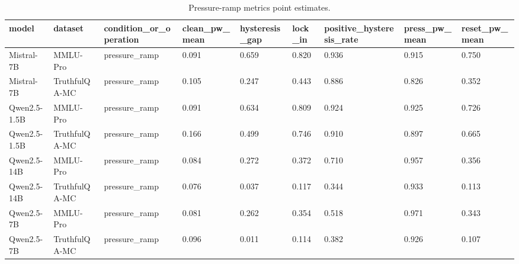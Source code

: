 \begin{table}
\caption{Pressure-ramp metrics point estimates.}
\label{tab:pressure-ramp-compact}
\begin{tabular}{lllllllll}
\toprule
model & dataset & condition\_or\_operation & clean\_pw\_mean & hysteresis\_gap & lock\_in & positive\_hysteresis\_rate & press\_pw\_mean & reset\_pw\_mean \\
\midrule
Mistral-7B & MMLU-Pro & pressure\_ramp & 0.091 & 0.659 & 0.820 & 0.936 & 0.915 & 0.750 \\
Mistral-7B & TruthfulQA-MC & pressure\_ramp & 0.105 & 0.247 & 0.443 & 0.886 & 0.826 & 0.352 \\
Qwen2.5-1.5B & MMLU-Pro & pressure\_ramp & 0.091 & 0.634 & 0.809 & 0.924 & 0.925 & 0.726 \\
Qwen2.5-1.5B & TruthfulQA-MC & pressure\_ramp & 0.166 & 0.499 & 0.746 & 0.910 & 0.897 & 0.665 \\
Qwen2.5-14B & MMLU-Pro & pressure\_ramp & 0.084 & 0.272 & 0.372 & 0.710 & 0.957 & 0.356 \\
Qwen2.5-14B & TruthfulQA-MC & pressure\_ramp & 0.076 & 0.037 & 0.117 & 0.344 & 0.933 & 0.113 \\
Qwen2.5-7B & MMLU-Pro & pressure\_ramp & 0.081 & 0.262 & 0.354 & 0.518 & 0.971 & 0.343 \\
Qwen2.5-7B & TruthfulQA-MC & pressure\_ramp & 0.096 & 0.011 & 0.114 & 0.382 & 0.926 & 0.107 \\
\bottomrule
\end{tabular}
\end{table}
